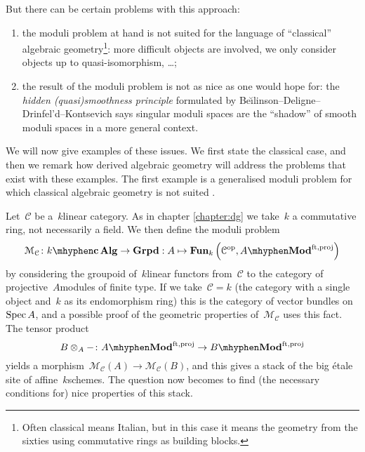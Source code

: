 \begin{refsection}
But there can be certain problems with this approach:
\begin{enumerate}
  \item the moduli problem at hand is not suited for the language of ``classical'' algebraic geometry\footnote{Often classical means Italian, but in this case it means the geometry from the sixties using commutative rings as building blocks.}: more difficult objects are involved, we only consider objects up to quasi-isomorphism, \dots;
  \item the result of the moduli problem is not as nice as one would hope for: the \emph{hidden (quasi)smoothness principle} formulated by Be\u\i linson--Deligne--Drinfel'd--Kontsevich says singular moduli spaces are the ``shadow'' of smooth moduli spaces in a more general context.
\end{enumerate}
We will now give examples of these issues. We first state the classical case, and then we remark how derived algebraic geometry will address the problems that exist with these examples. The first example is a generalised moduli problem for which classical algebraic geometry is not suited \cite[section 1]{toen-vaquie}.
\begin{example}
  Let~$\mathcal{C}$ be a~$k$\dash linear category. As in chapter \ref{chapter:dg} we take~$k$ a commutative ring, not necessarily a field. We then define the moduli problem
  \begin{equation}
    \label{equation:moduli-linear-category}
    \mathcal{M}_{\mathcal{C}}\colon k\mhyphen\mathbf{c\,Alg}\to\mathbf{Grpd}:A\mapsto\Fun_k\left( \mathcal{C}^\opp,A\mhyphen\Mod^{\mathrm{ft,proj}} \right)
  \end{equation}
  by considering the groupoid of~$k$\dash linear functors from~$\mathcal{C}$ to the category of projective~$A$\dash modules of finite type. If we take~$\mathcal{C}=k$ (the category with a single object and~$k$ as its endomorphism ring) this is the category of vector bundles on~$\operatorname{Spec} A$, and a possible proof of the geometric properties of~$\mathcal{M}_{\mathcal{C}}$ uses this fact. The tensor product
  \begin{equation}
    B\otimes_A-\colon A\mhyphen\Mod^{\mathrm{ft,proj}}\to B\mhyphen\Mod^{\mathrm{ft,proj}}
  \end{equation}
  yields a morphism~$\mathcal{M}_{\mathcal{C}}(A)\to\mathcal{M}_{\mathcal{C}}(B)$, and this gives a stack of the big \'etale site of affine~$k$\dash schemes. The question now becomes to find (the necessary conditions for) nice properties of this stack.


\end{example}
\end{refsection}
